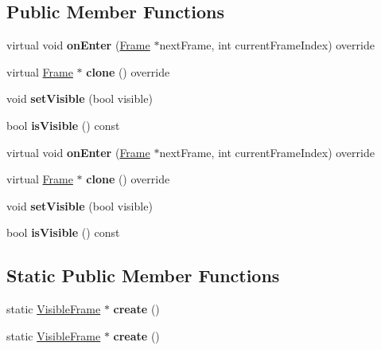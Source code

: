 \subsection*{Public Member Functions}
\begin{DoxyCompactItemize}
\item 
\mbox{\label{classVisibleFrame_a7a6f45f7e15c201a4c4ef230f853af18}} 
virtual void {\bfseries on\+Enter} (\hyperlink{classFrame}{Frame} $\ast$next\+Frame, int current\+Frame\+Index) override
\item 
\mbox{\label{classVisibleFrame_ae2ebbcb7d311109293adc687b7bdae41}} 
virtual \hyperlink{classFrame}{Frame} $\ast$ {\bfseries clone} () override
\item 
\mbox{\label{classVisibleFrame_a4728331a7d9f8586c6b23dbf59d78eae}} 
void {\bfseries set\+Visible} (bool visible)
\item 
\mbox{\label{classVisibleFrame_a14b33b11f5008bbf7c2c603af9ea2ef0}} 
bool {\bfseries is\+Visible} () const
\item 
\mbox{\label{classVisibleFrame_a0fea0d935ecc7d57342f1f0093ceeb75}} 
virtual void {\bfseries on\+Enter} (\hyperlink{classFrame}{Frame} $\ast$next\+Frame, int current\+Frame\+Index) override
\item 
\mbox{\label{classVisibleFrame_a5598aa3206eb132789a102fe37d81190}} 
virtual \hyperlink{classFrame}{Frame} $\ast$ {\bfseries clone} () override
\item 
\mbox{\label{classVisibleFrame_a4728331a7d9f8586c6b23dbf59d78eae}} 
void {\bfseries set\+Visible} (bool visible)
\item 
\mbox{\label{classVisibleFrame_a14b33b11f5008bbf7c2c603af9ea2ef0}} 
bool {\bfseries is\+Visible} () const
\end{DoxyCompactItemize}
\subsection*{Static Public Member Functions}
\begin{DoxyCompactItemize}
\item 
\mbox{\label{classVisibleFrame_a8c562d1041026ff6e58688fe5d0542ea}} 
static \hyperlink{classVisibleFrame}{Visible\+Frame} $\ast$ {\bfseries create} ()
\item 
\mbox{\label{classVisibleFrame_a1db13589bf12472d2ac864ace4e54188}} 
static \hyperlink{classVisibleFrame}{Visible\+Frame} $\ast$ {\bfseries create} ()
\end{DoxyCompactItemize}
